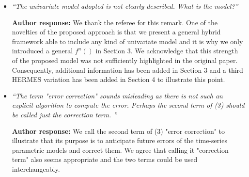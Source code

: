 \documentclass[10pt]{article} %
\begin{document}
\begin{itemize}
	
	\item {\em ``The univariate model adopted is not clearly described. What is the model?''} \medskip
	
	\textbf{Author response:} We thank the referee for this remark. One of the novelties of the proposed approach is that we present a general hybrid framework able to include any kind of univariate model and it is why we only introduced a general $f^n()$ in Section 3. We acknowledge that this strength of the proposed model was not sufficiently highlighted in the original paper. Consequently, additional information has been added in Section 3 and a third HERMES variation has been added in Section 4 to illustrate this point.\\
	
	\item {\em ``The term "error correction" sounds misleading as there is not such an explicit algorithm to compute the error. Perhaps the second term of (3) should be called just the correction term. ''} \medskip
	
	\textbf{Author response:} We call the second term of (3) "error correction" to illustrate that its purpose is to anticipate future errors of the time-series parametric models and correct them. We agree that calling it "correction term" also seems appropriate and the two terms could be used interchangeably.\\
	

\end{itemize}
\end{document}
